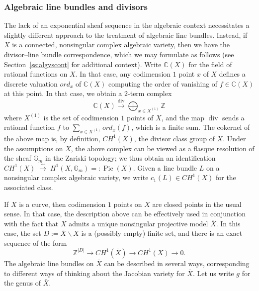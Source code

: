 \documentclass[11pt,leqno]{article}
\newcommand{\isomto}{{\stackrel{\sim}{\;\longrightarrow\;}}}
\newcommand{\cplx}{{\mathbb C}}
\newcommand{\Z}{{\mathbb Z}}
\renewcommand{\1}{{\rm 1\hspace*{-0.4ex}%
\rule{0.1ex}{1.52ex}\hspace*{0.2ex}}}
\newcommand{\gm}[1]{{{\mathbb G}_{m}^{#1}}}
\newcommand{\Gm}{{\gm{}}}
\newcommand{\Pic}{\operatorname{Pic}}
\newcommand{\<}[1]{{\langle}#1 {\rangle}}
\renewcommand{\setminus}{\smallsetminus}
\theoremstyle{plain}
\theoremstyle{definition}
\theoremstyle{remark}
\numberwithin{equation}{subsection}
\begin{document}
\subsubsection*{Algebraic line bundles and divisors}
The lack of an exponential sheaf sequence in the algebraic context necessitates a slightly different approach to the treatment of algebraic line bundles.  Instead, if $X$ is a connected, nonsingular complex algebraic variety, then we have the divisor--line bundle correspondence, which we may formulate as follows (see Section~\ref{ss:algvscont} for additional context).  Write $\cplx(X)$ for the field of rational functions on $X$.  In that case, any codimension $1$ point $x$ of $X$ defines a discrete valuation $ord_x$ of $\cplx(X)$ computing the order of vanishing of $f \in \cplx(X)$ at this point.  In that case, we obtain a $2$-term complex 
\[
\cplx(X) \stackrel{\operatorname{div}}{\longrightarrow} \bigoplus_{x \in X^{(1)}} \Z
\]
where $X^{(1)}$ is the set of codimension $1$ points of $X$, and the map $\operatorname{div}$ sends a rational function $f$ to $\sum_{x \in X^{(1)}} ord_x (f)$, which is a finite sum.  The cokernel of the above map is, by definition, $CH^1(X)$, the divisor class group of $X$.  Under the assumptions on $X$, the above complex can be viewed as a flasque resolution of the sheaf $\Gm$ in the Zariski topology; we thus obtain an identification $CH^1(X) \isomto  H^1(X,\Gm) =: \Pic(X)$.  Given a line bundle $L$ on a nonsingular complex algebraic variety, we write $c_1(L) \in CH^1(X)$ for the associated class. 

If $X$ is a curve, then codimension $1$ points on $X$ are closed points in the usual sense.  In that case, the description above can be effectively used in conjunction with the fact that $X$ admits a unique nonsingular projective model $\bar{X}$.  In this case, the set $D := \bar{X} \setminus X$ is a (possibly empty) finite set, and there is an exact sequence of the form
\[
\Z^{|D|} \longrightarrow CH^1(\bar{X}) \longrightarrow CH^1(X) \longrightarrow 0.
\]
The algebraic line bundles on $\bar{X}$ can be described in several ways, corresponding to different ways of thinking about the Jacobian variety for $\bar{X}$.  Let us write $g$ for the genus of $\bar{X}$.
\end{document}
